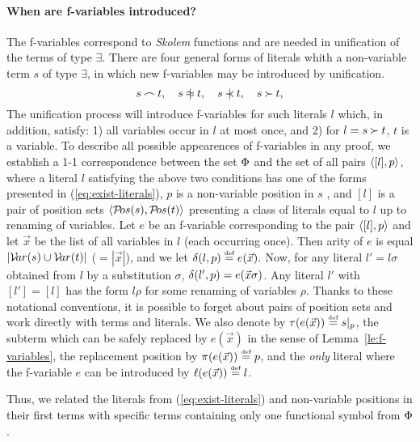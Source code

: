 \paragraph{When are f-variables introduced?\ }
%
The f-variables correspond to {\em Skolem} functions and are needed in
unification of the terms of type $\exists$. 
 There are four general forms of literals whith a non-variable 
term $s$ of type $\exists$, 
in which new f-variables may be introduced by unification.
\begin{equation} \label{eq:exist-literals}
 s\Int t,\quad s\notEq t, \quad s\notIncl t, \quad  s\Cont t,
\end{equation} 
The unification process will introduce  f-variables for
such literals $l$ which, in addition, satisfy:
1) all variables occur in $l$ at most once, and
2) for $l= s\mathbin{\succ} t$, $t$ is a variable.
To describe all possible appearences of f-variables in any proof, we establish
a 1-1 correspondence  between the set $\Phi$ and the set of all
pairs \(\langle[l],p\rangle\), where a literal $l$ satisfying the above two conditions
has one of the forms presented in
(\ref {eq:exist-literals}), $p$ is a non-variable position in $s$ , and
\([l]\) is a pair of position sets \(\langle{\sl{\cal P}\!os}(s) ,{\sl{\cal P}\!os}(t)\rangle\) presenting a class
of literals equal to $l$ up to renaming of variables.  Let $e$ be an
f-variable corresponding to the pair \(\langle[l],p\rangle\) and let
$\vec x$ be the list of all variables in $l$ (each occurring once).  Then
arity of $e$ is equal \(|{\sl{\cal V}\!ar}(s)\cup{\sl{\cal V}\!ar}(t)|\) (\(=|\vec x|\)), and we let
$\delta(l,p)\mathrel {\stackrel {\mbox {\tiny def}}{=}} e(\vec x).$ 
Now, for any literal $l'=l\sigma$ obtained from
$l$ by a substitution $\sigma$, \(\delta(l',p)=e(\vec x\sigma)\).  Any literal
$l'$ with \([l']=[l]\) has the form \(l\rho\) for some renaming of
variables $\rho$.  Thanks to these notational conventions,
 it is possible to forget about
pairs of position sets and work directly with terms and literals.  We also
denote by
$\tau(e(\vec x))\mathrel {\stackrel {\mbox {\tiny def}}{=}} s|_{p}$, 
the subterm which can be safely
replaced by $e(\vec x)$ in the sense of Lemma~\ref {le:f-variables}, 
the replacement position by
$\pi(e(\vec x))\mathrel {\stackrel {\mbox {\tiny def}}{=}} p$, 
and the {\em only} literal
where the f-variable $e$ can be introduced by
$\ell(e(\vec x))\mathrel {\stackrel {\mbox {\tiny def}}{=}} l$.

Thus, we related the literals from (\ref{eq:exist-literals}) 
and non-variable positions in their first terms with
specific terms containing only one functional symbol from \( \Phi\).

